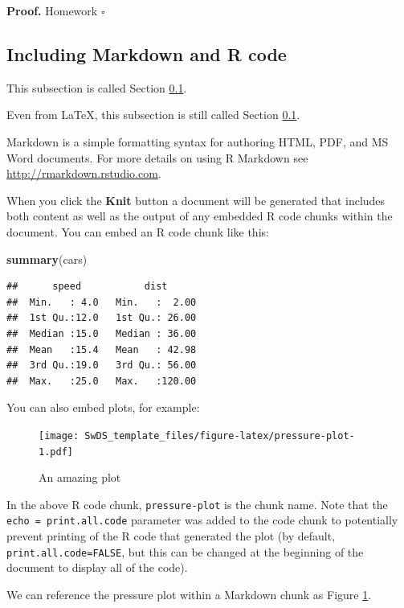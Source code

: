 \documentclass[
  11pt,
  twoside,
  11pt]{article}
\newenvironment{Shaded}{\begin{snugshade}}{\end{snugshade}}
\newcommand{\FunctionTok}[1]{\textcolor[rgb]{0.13,0.29,0.53}{\textbf{#1}}}
\newcommand{\NormalTok}[1]{#1}
\numberwithin{Theorem}{section}
\numberwithin{Definition}{section}
\numberwithin{Lemma}{section}
\numberwithin{Algorithm}{section}
\numberwithin{equation}{section}
\begin{document}
\noindent
\textbf{Proof.}
Homework
\hfill $\square$
\clearpage

\hypertarget{sec:IncludingMarkdown}{%
\subsection{Including Markdown and R code}\label{sec:IncludingMarkdown}}

This subsection is called Section \ref{sec:IncludingMarkdown}.

Even from LaTeX, this subsection is still called Section \ref{sec:IncludingMarkdown}.

Markdown is a simple formatting syntax for authoring HTML, PDF, and MS Word documents. For more details on using R Markdown see \url{http://rmarkdown.rstudio.com}.

When you click the \textbf{Knit} button a document will be generated that includes both content as well as the output of any embedded R code chunks within the document. You can embed an R code chunk like this:

\begin{Shaded}
\begin{Highlighting}[]
\FunctionTok{summary}\NormalTok{(cars)}
\end{Highlighting}
\end{Shaded}

\begin{verbatim}
##      speed           dist       
##  Min.   : 4.0   Min.   :  2.00  
##  1st Qu.:12.0   1st Qu.: 26.00  
##  Median :15.0   Median : 36.00  
##  Mean   :15.4   Mean   : 42.98  
##  3rd Qu.:19.0   3rd Qu.: 56.00  
##  Max.   :25.0   Max.   :120.00
\end{verbatim}

You can also embed plots, for example:

\begin{figure}
\centering
\texttt{[image: SwDS\_template\_files/figure-latex/pressure-plot-1.pdf]}
\caption{\label{fig:pressure-plot}An amazing plot}
\end{figure}

In the above R code chunk, \texttt{pressure-plot} is the chunk name. Note that the \texttt{echo\ =\ print.all.code} parameter was added to the code chunk to potentially prevent printing of the R code that generated the plot (by default, \texttt{print.all.code=FALSE}, but this can be changed at the beginning of the document to display all of the code).

We can reference the pressure plot within a Markdown chunk as Figure \ref{fig:pressure-plot}.
\end{document}
